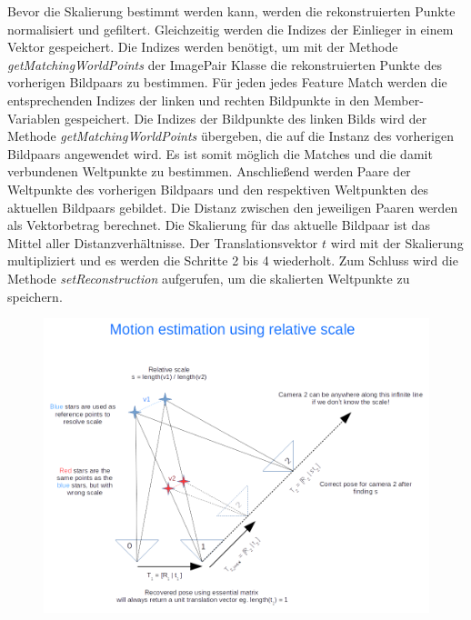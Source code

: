 Bevor die Skalierung bestimmt werden kann, werden die rekonstruierten Punkte normalisiert und gefiltert.
Gleichzeitig werden die Indizes der Einlieger in einem Vektor gespeichert. 
Die Indizes werden benötigt, um mit der Methode \emph{getMatchingWorldPoints} der ImagePair Klasse die rekonstruierten Punkte des vorherigen Bildpaars zu bestimmen.
Für jeden jedes Feature Match werden die entsprechenden Indizes der linken und rechten Bildpunkte in den Member-Variablen gespeichert.
Die Indizes der Bildpunkte des linken Bilds wird der Methode \emph{getMatchingWorldPoints} übergeben, die auf die Instanz des vorherigen Bildpaars angewendet wird.
Es ist somit möglich die Matches und die damit verbundenen Weltpunkte zu bestimmen.
Anschließend werden Paare der Weltpunkte des vorherigen Bildpaars und den respektiven Weltpunkten des aktuellen Bildpaars gebildet.
Die Distanz zwischen den jeweiligen Paaren werden als Vektorbetrag berechnet.
Die Skalierung für das aktuelle Bildpaar ist das Mittel aller Distanzverhältnisse.
Der Translationsvektor $t$ wird mit der Skalierung multipliziert und es werden die Schritte 2 bis 4 wiederholt.
Zum Schluss wird die Methode \emph{setReconstruction} aufgerufen, um die skalierten Weltpunkte zu speichern.
\begin{figure}
    \includegraphics[width=\textwidth]{src/img/nghiaho_2017_sfm_scaling}
    \caption{~\cite{nghiaho_2017}}
    \label{fig:sfm-scaling}
\end{figure}
